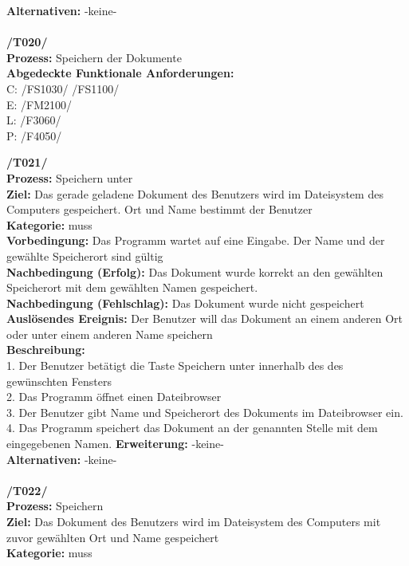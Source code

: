\documentclass[a4paper]{scrreprt}
\begin{document}
\textbf {Alternativen:} -keine- \\ \\
\textbf{/T020/} \\ 
\textbf{Prozess: }Speichern der Dokumente\\
\textbf{Abgedeckte Funktionale Anforderungen:}\\
C: /FS1030/ /FS1100/\\
E: /FM2100/	\\
L: /F3060/ \\
P: /F4050/\\
\begin{addmargin}[15pt]{0pt}
\textbf{/T021/} \\ 
\textbf{Prozess: }Speichern unter\\
\textbf{Ziel:} Das gerade geladene Dokument des Benutzers wird im Dateisystem des Computers gespeichert. Ort und Name bestimmt der Benutzer\\
\textbf{Kategorie:} muss\\
\textbf{Vorbedingung:} Das Programm wartet auf eine Eingabe. Der Name und der gewählte Speicherort sind gültig\\
\textbf{Nachbedingung (Erfolg):} Das Dokument wurde korrekt an den gewählten Speicherort mit dem gewählten Namen gespeichert.  \\
\textbf{Nachbedingung (Fehlschlag):} Das Dokument wurde nicht gespeichert \\
\textbf{Auslösendes Ereignis:} Der Benutzer will das Dokument an einem anderen Ort oder unter einem anderen Name speichern\\
\textbf{Beschreibung:} \\
1. Der Benutzer betätigt die Taste Speichern unter innerhalb des des gewünschten Fensters\\
2. Das Programm öffnet einen Dateibrowser\\
3. Der Benutzer gibt Name und Speicherort des Dokuments im Dateibrowser ein.
4. Das Programm speichert das Dokument an der genannten Stelle mit dem eingegebenen Namen.
\textbf {Erweiterung:} -keine- \\
\textbf {Alternativen:} -keine- \\ \\
\textbf{/T022/} \\ 
\textbf{Prozess: }Speichern\\
\textbf{Ziel:} Das Dokument des Benutzers wird im Dateisystem des Computers mit zuvor gewählten Ort und Name gespeichert\\
\textbf{Kategorie:} muss\\

\end{addmargin}
\end{document}
